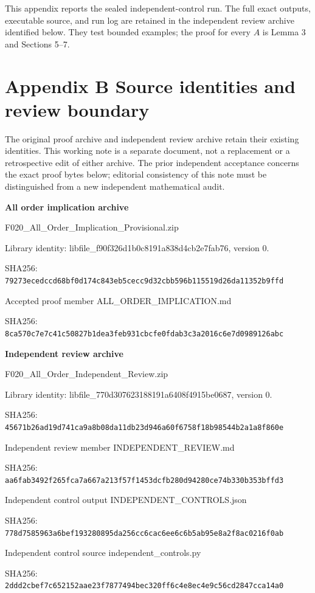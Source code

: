 \documentclass[
  11pt,
]{article}
\begin{document}
This appendix reports the sealed independent-control run. The full exact
outputs, executable source, and run log are retained in the independent
review archive identified below. They test bounded examples; the proof
for every \(A\) is Lemma 3 and Sections 5--7.

\section{Appendix B Source identities and review
boundary}\label{appendix-b-source-identities-and-review-boundary}

The original proof archive and independent review archive retain their
existing identities. This working note is a separate document, not a
replacement or a retrospective edit of either archive. The prior
independent acceptance concerns the exact proof bytes below; editorial
consistency of this note must be distinguished from a new independent
mathematical audit.

\textbf{All order implication archive}

F020\_All\_Order\_Implication\_Provisional.zip

Library identity: libfile\_f90f326d1b0c8191a838d4cb2e7fab76, version 0.

SHA256:
\texttt{79273ecedccd68bf0d174c843eb5cecc9d32cbb596b115519d26da11352b9ffd}

Accepted proof member ALL\_ORDER\_IMPLICATION.md

SHA256:
\texttt{8ca570c7e7c41c50827b1dea3feb931cbcfe0fdab3c3a2016c6e7d0989126abc}

\textbf{Independent review archive}

F020\_All\_Order\_Independent\_Review.zip

Library identity: libfile\_770d307623188191a6408f4915be0687, version 0.

SHA256:
\texttt{45671b26ad19d741ca9a8b08da11db23d946a60f6758f18b98544b2a1a8f860e}

Independent review member INDEPENDENT\_REVIEW.md

SHA256:
\texttt{aa6fab3492f265fca7a667a213f57f1453dcfb280d94280ce74b330b353bffd3}

Independent control output INDEPENDENT\_CONTROLS.json

SHA256:
\texttt{778d7585963a6bef193280895da256cc6cac6ee6c6b5ab95e8a2f8ac0216f0ab}

Independent control source independent\_controls.py

SHA256:
\texttt{2ddd2cbef7c652152aae23f7877494bec320ff6c4e8ec4e9c56cd2847cca14a0}
\end{document}
